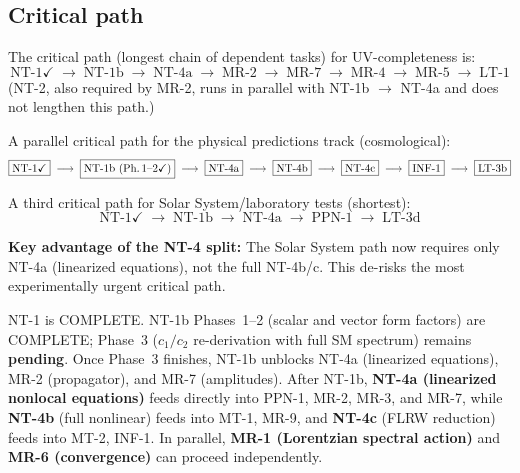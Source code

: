 \documentclass[12pt,a4paper]{article}
\begin{document}
\subsection{Critical path}

The critical path (longest chain of dependent tasks) for UV-completeness is:
\begin{equation*}
  \boxed{\text{NT-1}\checkmark} \;\longrightarrow\;
  \boxed{\text{NT-1b}} \;\longrightarrow\;
  \boxed{\text{NT-4a}} \;\longrightarrow\;
  \boxed{\text{MR-2}} \;\longrightarrow\;
  \boxed{\text{MR-7}} \;\longrightarrow\;
  \boxed{\text{MR-4}} \;\longrightarrow\;
  \boxed{\text{MR-5}} \;\longrightarrow\;
  \boxed{\text{LT-1}}
\end{equation*}
\noindent(NT-2, also required by MR-2, runs in parallel with NT-1b $\to$ NT-4a
and does not lengthen this path.)

A parallel critical path for the physical predictions track (cosmological):
\begin{equation*}
  \boxed{\text{NT-1}\checkmark} \;\longrightarrow\;
  \boxed{\text{NT-1b (Ph.\,1--2}\checkmark\text{)}} \;\longrightarrow\;
  \boxed{\text{NT-4a}} \;\longrightarrow\;
  \boxed{\text{NT-4b}} \;\longrightarrow\;
  \boxed{\text{NT-4c}} \;\longrightarrow\;
  \boxed{\text{INF-1}} \;\longrightarrow\;
  \boxed{\text{LT-3b}}
\end{equation*}

A third critical path for Solar System/laboratory tests (shortest):
\begin{equation*}
  \boxed{\text{NT-1}\checkmark} \;\longrightarrow\;
  \boxed{\text{NT-1b}} \;\longrightarrow\;
  \boxed{\text{NT-4a}} \;\longrightarrow\;
  \boxed{\text{PPN-1}} \;\longrightarrow\;
  \boxed{\text{LT-3d}}
\end{equation*}

\textbf{Key advantage of the NT-4 split:} The Solar System path now requires only
NT-4a (linearized equations), not the full NT-4b/c. This de-risks the most
experimentally urgent critical path.

NT-1 is \textcolor{proven}{COMPLETE}.
NT-1b Phases~1--2 (scalar and vector form factors) are
\textcolor{proven}{COMPLETE}; Phase~3 ($c_1/c_2$ re-derivation with full SM
spectrum) remains \textbf{pending}.
Once Phase~3 finishes, NT-1b unblocks NT-4a (linearized equations), MR-2 (propagator),
and MR-7 (amplitudes).
After NT-1b, \textbf{NT-4a (linearized nonlocal equations)} feeds directly into
PPN-1, MR-2, MR-3, and MR-7, while \textbf{NT-4b} (full nonlinear) feeds into
MT-1, MR-9, and \textbf{NT-4c} (FLRW reduction) feeds into MT-2, INF-1.
In parallel, \textbf{MR-1 (Lorentzian spectral action)} and
\textbf{MR-6 (convergence)} can proceed independently.
\end{document}

